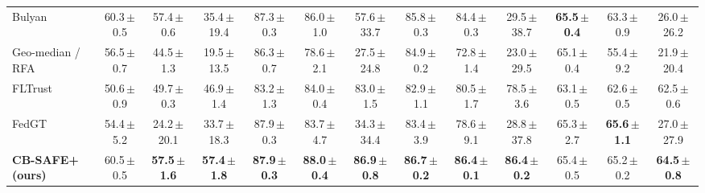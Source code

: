 \begin{table}[t]
\begin{tabular}{@{}lcccccccccccc@{}}
Bulyan~\cite{bulyan} & 60.3\,{\scriptsize$\pm$0.5} & 57.4\,{\scriptsize$\pm$0.6} & 35.4\,{\scriptsize$\pm$19.4} & 87.3\,{\scriptsize$\pm$0.3} & 86.0\,{\scriptsize$\pm$1.0} & 57.6\,{\scriptsize$\pm$33.7} & 85.8\,{\scriptsize$\pm$0.3} & 84.4\,{\scriptsize$\pm$0.3} & 29.5\,{\scriptsize$\pm$38.7} & \textbf{65.5\,{\scriptsize$\pm$0.4}} & 63.3\,{\scriptsize$\pm$0.9} & 26.0\,{\scriptsize$\pm$26.2}\\
Geo-median / RFA~\cite{rfa} & 56.5\,{\scriptsize$\pm$0.7} & 44.5\,{\scriptsize$\pm$1.3} & 19.5\,{\scriptsize$\pm$13.5} & 86.3\,{\scriptsize$\pm$0.7} & 78.6\,{\scriptsize$\pm$2.1} & 27.5\,{\scriptsize$\pm$24.8} & 84.9\,{\scriptsize$\pm$0.2} & 72.8\,{\scriptsize$\pm$1.4} & 23.0\,{\scriptsize$\pm$29.5} & 65.1\,{\scriptsize$\pm$0.4} & 55.4\,{\scriptsize$\pm$9.2} & 21.9\,{\scriptsize$\pm$20.4}\\
FLTrust~\cite{fltrust} & 50.6\,{\scriptsize$\pm$0.9} & 49.7\,{\scriptsize$\pm$0.3} & 46.9\,{\scriptsize$\pm$1.4} & 83.2\,{\scriptsize$\pm$1.3} & 84.0\,{\scriptsize$\pm$0.4} & 83.0\,{\scriptsize$\pm$1.5} & 82.9\,{\scriptsize$\pm$1.1} & 80.5\,{\scriptsize$\pm$1.7} & 78.5\,{\scriptsize$\pm$3.6} & 63.1\,{\scriptsize$\pm$0.5} & 62.6\,{\scriptsize$\pm$0.5} & 62.5\,{\scriptsize$\pm$0.6}\\
FedGT~\cite{fedgt} & 54.4\,{\scriptsize$\pm$5.2} & 24.2\,{\scriptsize$\pm$20.1} & 33.7\,{\scriptsize$\pm$18.3} & 87.9\,{\scriptsize$\pm$0.3} & 83.7\,{\scriptsize$\pm$4.7} & 34.3\,{\scriptsize$\pm$34.4} & 83.4\,{\scriptsize$\pm$3.9} & 78.6\,{\scriptsize$\pm$9.1} & 28.8\,{\scriptsize$\pm$37.8} & 65.3\,{\scriptsize$\pm$2.7} & \textbf{65.6\,{\scriptsize$\pm$1.1}} & 27.0\,{\scriptsize$\pm$27.9}\\
\textbf{CB-SAFE+ (ours)} & 60.5\,{\scriptsize$\pm$0.5} & \textbf{57.5\,{\scriptsize$\pm$1.6}} & \textbf{57.4\,{\scriptsize$\pm$1.8}} & \textbf{87.9\,{\scriptsize$\pm$0.3}} & \textbf{88.0\,{\scriptsize$\pm$0.4}} & \textbf{86.9\,{\scriptsize$\pm$0.8}} & \textbf{86.7\,{\scriptsize$\pm$0.2}} & \textbf{86.4\,{\scriptsize$\pm$0.1}} & \textbf{86.4\,{\scriptsize$\pm$0.2}} & 65.4\,{\scriptsize$\pm$0.5} & 65.2\,{\scriptsize$\pm$0.2} & \textbf{64.5\,{\scriptsize$\pm$0.8}}\\
\bottomrule\end{tabular}\end{table}